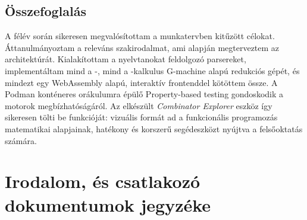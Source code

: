 \documentclass[a4paper,oneside]{article}
\begin{document}
\subsection{Összefoglalás}
\label{sec:osszefoglalas}

A félév során sikeresen megvalósítottam a munkatervben kitűzött célokat. Áttanulmányoztam a releváns szakirodalmat, ami alapján megterveztem az architektúrát. Kialakítottam a nyelvtanokat feldolgozó parsereket, implementáltam mind a \lam-, mind a \ski-kalkulus G-machine alapú redukciós gépét, és mindezt egy WebAssembly alapú, interaktív frontenddel kötöttem össze. A Podman konténeres orákulumra épülő \foreignlanguage{english}{Property-based testing} gondoskodik a motorok megbízhatóságáról. Az elkészült \emph{Combinator Explorer} eszköz így sikeresen tölti be funkcióját: vizuális formát ad a funkcionális programozás matematikai alapjainak, hatékony és korszerű segédeszközt nyújtva a felsőoktatás számára.

\newpage

\section{Irodalom, és csatlakozó dokumentumok jegyzéke}
\label{sec:irod-es-csatl}

\label{sec:tanulm-irod-jegyz}


\end{document}
